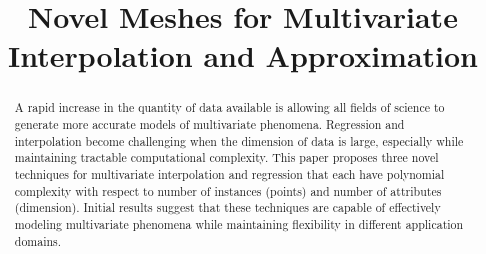 \documentclass[sigconf]{acmart}
\begin{document}
\title{Novel Meshes for Multivariate Interpolation and Approximation}






\begin{abstract}

A rapid increase in the quantity of data available is allowing all fields of science to generate more accurate models of multivariate phenomena. Regression and interpolation become challenging when the dimension of data is large, especially while maintaining tractable computational complexity. This paper proposes three novel techniques for multivariate interpolation and regression that each have polynomial complexity with respect to number of instances (points) and number of attributes (dimension). Initial results suggest that these techniques are capable of effectively modeling multivariate phenomena while maintaining flexibility in different application domains.

\end{abstract}

%
%
\end{document}
